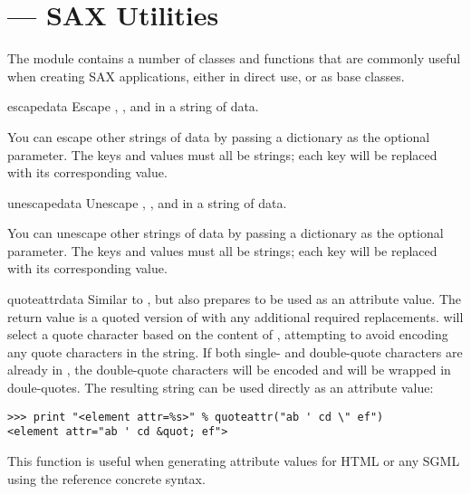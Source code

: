 \section{ ---
         SAX Utilities}




The module  contains a number of classes and
functions that are commonly useful when creating SAX applications,
either in direct use, or as base classes.

\begin{funcdesc}{escape}{data}
  Escape \character{\&}, \character{<}, and \character{>} in a string
  of data.

  You can escape other strings of data by passing a dictionary as the
  optional  parameter.  The keys and values must all be
  strings; each key will be replaced with its corresponding value.
\end{funcdesc}

\begin{funcdesc}{unescape}{data}
  Unescape , , and 
  in a string of data.

  You can unescape other strings of data by passing a dictionary as the
  optional  parameter.  The keys and values must all be
  strings; each key will be replaced with its corresponding value.

\end{funcdesc}

\begin{funcdesc}{quoteattr}{data}
  Similar to , but also prepares  to be
  used as an attribute value.  The return value is a quoted version of
   with any additional required replacements.
   will select a quote character based on the
  content of , attempting to avoid encoding any quote
  characters in the string.  If both single- and double-quote
  characters are already in , the double-quote characters
  will be encoded and  will be wrapped in doule-quotes.  The
  resulting string can be used directly as an attribute value:

\begin{verbatim}
>>> print "<element attr=%s>" % quoteattr("ab ' cd \" ef")
<element attr="ab ' cd &quot; ef">
\end{verbatim}

  This function is useful when generating attribute values for HTML or
  any SGML using the reference concrete syntax.
\end{funcdesc}

